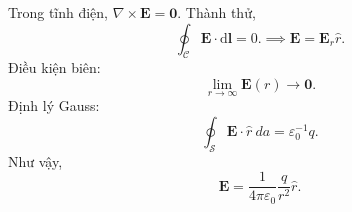 \begin{frame}
\begin{columns}
        \begin{column}{0.3\textwidth}
            \scriptsize
            Trong tĩnh điện, \(\nabla\times\mathbf{E}=\mathbf{0}\). Thành thử, \[\oint_{\mathcal{C}}\mathbf{E}\cdot\text{d}\mathbf{l}=0.\implies \mathbf{E}=\mathbf{E}_r \hat{r}.\]
            Điều kiện biên:\vspace{-5pt} \[\lim_{r\to\infty}\mathbf{E}(r)\to\mathbf{0}.\]
            Định lý Gauss:\vspace{-5pt} \[\oint_{\mathcal{S}}\mathbf{E}\cdot\hat{r}~da =\varepsilon_{0}^{-1}q.\]
            Như vậy, \vspace{-5pt}\[\mathbf{E}=\frac{1}{4\pi\varepsilon_0}\frac{q}{r^2}\hat{r}.\]
        \end{column}
    \end{columns}
\end{frame}
